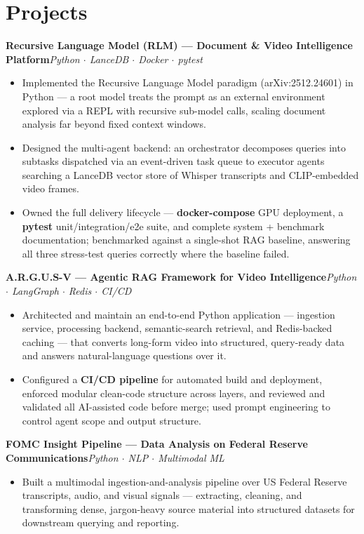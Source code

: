 \documentclass[10pt,a4paper]{article}
\newcommand{\proj}[2]{\vspace{0.6mm}\noindent\textbf{#1}\hfill{\footnotesize\itshape #2}\par\vspace{-0.4mm}}
\begin{document}
\section{Projects}
{\small
\proj{Recursive Language Model (RLM) --- Document \& Video Intelligence Platform}{Python $\cdot$ LanceDB $\cdot$ Docker $\cdot$ pytest}
\begin{itemize}
\item Implemented the Recursive Language Model paradigm (arXiv:2512.24601) in Python --- a root model treats the prompt as an external environment explored via a REPL with recursive sub-model calls, scaling document analysis far beyond fixed context windows.
\item Designed the multi-agent backend: an orchestrator decomposes queries into subtasks dispatched via an event-driven task queue to executor agents searching a LanceDB vector store of Whisper transcripts and CLIP-embedded video frames.
\item Owned the full delivery lifecycle --- \textbf{docker-compose} GPU deployment, a \textbf{pytest} unit/integration/e2e suite, and complete system + benchmark documentation; benchmarked against a single-shot RAG baseline, answering all three stress-test queries correctly where the baseline failed.
\end{itemize}
\proj{A.R.G.U.S-V --- Agentic RAG Framework for Video Intelligence}{Python $\cdot$ LangGraph $\cdot$ Redis $\cdot$ CI/CD}
\begin{itemize}
\item Architected and maintain an end-to-end Python application --- ingestion service, processing backend, semantic-search retrieval, and Redis-backed caching --- that converts long-form video into structured, query-ready data and answers natural-language questions over it.
\item Configured a \textbf{CI/CD pipeline} for automated build and deployment, enforced modular clean-code structure across layers, and reviewed and validated all AI-assisted code before merge; used prompt engineering to control agent scope and output structure.
\end{itemize}
\proj{FOMC Insight Pipeline --- Data Analysis on Federal Reserve Communications}{Python $\cdot$ NLP $\cdot$ Multimodal ML}
\begin{itemize}
\item Built a multimodal ingestion-and-analysis pipeline over US Federal Reserve transcripts, audio, and visual signals --- extracting, cleaning, and transforming dense, jargon-heavy source material into structured datasets for downstream querying and reporting.
\end{itemize}}
\end{document}
